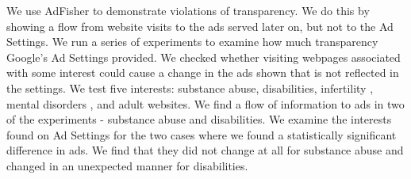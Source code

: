 \documentclass[10pt, onecolumn]{report}
\begin{document}
We use AdFisher to demonstrate violations of transparency. We do this by showing
a flow from website visits to the ads served later on, but not to the Ad Settings.
We run a series of experiments to examine how much 
transparency Google's Ad Settings provided.  We checked whether 
visiting webpages associated with some interest could cause a 
change in the ads shown that is not reflected in the settings.
We test five interests: substance abuse, disabilities, infertility
, mental disorders%
, and adult websites. 
We find a flow of information to ads in two of the experiments - substance abuse
and disabilities.
We examine the interests found on Ad Settings for the 
two cases where we found a statistically significant difference in ads.
We find that they did not change at all for substance abuse and 
changed in an unexpected manner for disabilities.
\end{document}
